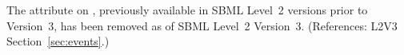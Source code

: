 The  attribute on \Event, previously available in SBML
Level~2 versions prior to Version~3, has been removed as of SBML Level~2
Version~3.  (References: L2V3 Section~\ref{sec:events}.)

